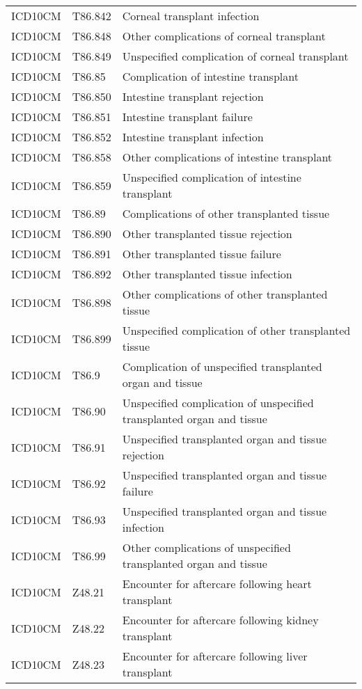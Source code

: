 \begin{table}[ht]
\begin{tabular}{lll}
  ICD10CM & T86.842 & Corneal transplant infection \\ 
  ICD10CM & T86.848 & Other complications of corneal transplant \\ 
  ICD10CM & T86.849 & Unspecified complication of corneal transplant \\ 
  ICD10CM & T86.85 & Complication of intestine transplant \\ 
  ICD10CM & T86.850 & Intestine transplant rejection \\ 
  ICD10CM & T86.851 & Intestine transplant failure \\ 
  ICD10CM & T86.852 & Intestine transplant infection \\ 
  ICD10CM & T86.858 & Other complications of intestine transplant \\ 
  ICD10CM & T86.859 & Unspecified complication of intestine transplant \\ 
  ICD10CM & T86.89 & Complications of other transplanted tissue \\ 
  ICD10CM & T86.890 & Other transplanted tissue rejection \\ 
  ICD10CM & T86.891 & Other transplanted tissue failure \\ 
  ICD10CM & T86.892 & Other transplanted tissue infection \\ 
  ICD10CM & T86.898 & Other complications of other transplanted tissue \\ 
  ICD10CM & T86.899 & Unspecified complication of other transplanted tissue \\ 
  ICD10CM & T86.9 & Complication of unspecified transplanted organ and tissue \\ 
  ICD10CM & T86.90 & Unspecified complication of unspecified transplanted organ and tissue \\ 
  ICD10CM & T86.91 & Unspecified transplanted organ and tissue rejection \\ 
  ICD10CM & T86.92 & Unspecified transplanted organ and tissue failure \\ 
  ICD10CM & T86.93 & Unspecified transplanted organ and tissue infection \\ 
  ICD10CM & T86.99 & Other complications of unspecified transplanted organ and tissue \\ 
  ICD10CM & Z48.21 & Encounter for aftercare following heart transplant \\ 
  ICD10CM & Z48.22 & Encounter for aftercare following kidney transplant \\ 
  ICD10CM & Z48.23 & Encounter for aftercare following liver transplant \\ 

\end{tabular}
\end{table}
